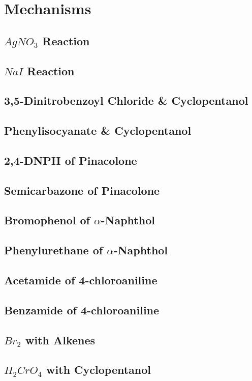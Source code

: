 \documentclass[11pt]{article}
\begin{document}
	\section{Mechanisms}
	\subsection{$AgNO_3$ Reaction}
	\subsection{$NaI$ Reaction}
	\subsection{3,5-Dinitrobenzoyl Chloride \& Cyclopentanol}
	\subsection{Phenylisocyanate \& Cyclopentanol}
	\subsection{2,4-DNPH of Pinacolone}
	\subsection{Semicarbazone of Pinacolone}
	\subsection{Bromophenol of $\alpha$-Naphthol}
	\subsection{Phenylurethane of $\alpha$-Naphthol}
	\subsection{Acetamide of 4-chloroaniline}
	\subsection{Benzamide of 4-chloroaniline}
	\subsection{$Br_2$ with Alkenes}
	\subsection{$H_2CrO_4$ with Cyclopentanol}
\end{document}
